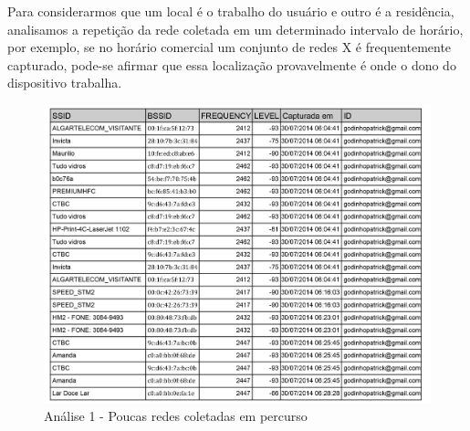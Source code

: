 \documentclass[12pt, %
openright, 
oneside,
a4paper,
brazil]{facom-ufu-abntex2}
\begin{document}
Para considerarmos que um local é o trabalho do usuário e outro é a residência, analisamos a repetição da rede coletada em um determinado intervalo de horário, por exemplo, se no horário comercial um conjunto de redes X é frequentemente capturado, pode-se afirmar que essa localização provavelmente é onde o dono do dispositivo trabalha.




\begin{figure}[hbt]
  \includegraphics{analise1}
  \caption{Análise 1 - Poucas redes coletadas em percurso}
\end{figure}
\end{document}

